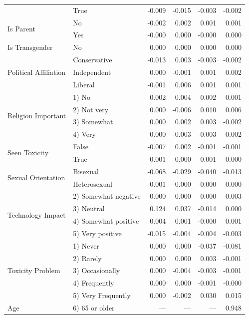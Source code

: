 \begin{longtable}{llrrrr}
 & True & -0.009 & -0.015 & -0.003 & -0.002 \\
\cline{1-6}
\multirow[t]{2}{*}{Is Parent} & No & -0.002 & 0.002 & 0.001 & 0.001 \\
 & Yes & -0.000 & 0.000 & -0.000 & 0.000 \\
\cline{1-6}
Is Transgender & No & 0.000 & 0.000 & 0.000 & 0.000 \\
\cline{1-6}
\multirow[t]{3}{*}{Political Affiliation} & Conservative & -0.013 & 0.003 & -0.003 & -0.002 \\
 & Independent & 0.000 & -0.001 & 0.001 & 0.002 \\
 & Liberal & -0.001 & 0.006 & 0.001 & 0.001 \\
\cline{1-6}
\multirow[t]{4}{*}{Religion Important} & 1) No & 0.002 & 0.004 & 0.002 & 0.001 \\
 & 2) Not very & 0.000 & -0.006 & 0.010 & 0.006 \\
 & 3) Somewhat & 0.000 & 0.002 & 0.003 & -0.002 \\
 & 4) Very & 0.000 & -0.003 & -0.003 & -0.002 \\
\cline{1-6}
\multirow[t]{2}{*}{Seen Toxicity} & False & -0.007 & 0.002 & -0.001 & -0.001 \\
 & True & -0.001 & 0.000 & 0.001 & 0.000 \\
\cline{1-6}
\multirow[t]{2}{*}{Sexual Orientation} & Bisexual & -0.068 & -0.029 & -0.040 & -0.013 \\
 & Heterosexual & -0.001 & -0.000 & -0.000 & 0.000 \\
\cline{1-6}
\multirow[t]{4}{*}{Technology Impact} & 2) Somewhat negative & 0.000 & 0.000 & 0.000 & 0.003 \\
 & 3) Neutral & 0.124 & 0.037 & -0.014 & 0.000 \\
 & 4) Somewhat positive & 0.004 & 0.001 & -0.000 & 0.001 \\
 & 5) Very positive & -0.015 & -0.004 & -0.004 & -0.003 \\
\cline{1-6}
\multirow[t]{5}{*}{Toxicity Problem} & 1) Never & 0.000 & 0.000 & -0.037 & -0.081 \\
 & 2) Rarely & 0.000 & 0.000 & 0.003 & -0.001 \\
 & 3) Occasionally & 0.000 & -0.004 & -0.003 & -0.001 \\
 & 4) Frequently & 0.000 & 0.000 & -0.001 & -0.000 \\
 & 5) Very Frequently & 0.000 & -0.002 & 0.030 & 0.015 \\
\cline{1-6}
Age & 6) 65 or older & --- & --- & --- & 0.948 \\

\end{longtable}
